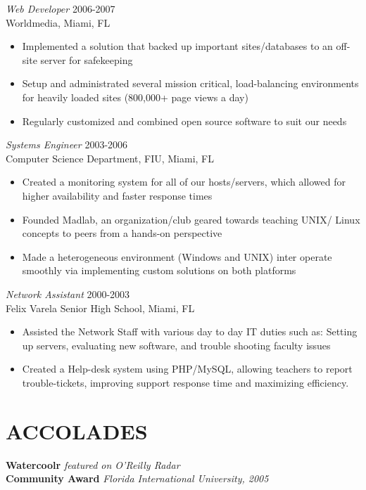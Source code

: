 \documentclass[margin]{res}
\begin{document}
\begin{resume}
  {\sl Web Developer} \hfill 2006-2007 \\
  Worldmedia, Miami, FL
  \begin{itemize}  \itemsep -2pt %
  \item Implemented a solution that backed up important sites/databases
    to an off-site server for safekeeping
  \item Setup and administrated several mission critical, load-balancing
    environments for heavily loaded sites (800,000+ page views a day)
  \item Regularly customized and combined open source software to suit our needs
  \end{itemize}
  
  {\sl Systems Engineer} \hfill            2003-2006 \\
  Computer Science Department, FIU, Miami, FL
  \begin{itemize}  \itemsep -2pt %
  \item Created a monitoring system for all of our hosts/servers, which allowed
    for higher availability and faster response times
  \item Founded Madlab, an organization/club geared towards teaching UNIX/
    Linux concepts to peers from a hands-on perspective
  \item Made a heterogeneous environment (Windows and UNIX) inter
    operate smoothly via implementing custom solutions on both platforms
  \end{itemize} 
  
  {\sl Network Assistant} \hfill        2000-2003 \\
  Felix Varela Senior High School, Miami, FL
  \begin{itemize}  \itemsep -2pt %
  \item Assisted the Network Staff with various day to day IT duties such as:
    Setting up servers, evaluating new software, and trouble shooting faculty issues
  \item Created a Help-desk system using PHP/MySQL, allowing teachers to
    report trouble-tickets, improving support response time and maximizing
    efficiency.
    \end{itemize} 

  \section{ACCOLADES}
  {\bf Watercoolr }{\it featured on O'Reilly Radar} \\
  {\bf Community Award }{\it Florida International University, 2005}

 \end{resume}
\end{document}
